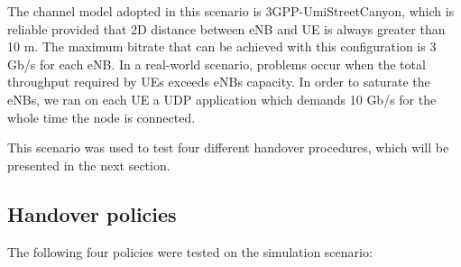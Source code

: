 \documentclass[conference,10pt]{IEEEtran}
\begin{document}
The channel model adopted in this scenario is 3GPP-UmiStreetCanyon, which is reliable provided that 2D distance between eNB and UE is always greater than 10 m. The maximum bitrate that can be achieved with this configuration is 3 Gb/s for each eNB. In a real-world scenario, problems occur when the total throughput required by UEs exceeds eNBs capacity. In order to saturate the eNBs, we ran on each UE a UDP application which demands 10 Gb/s for the whole time the node is connected.

This scenario was used to test four different handover procedures, which will be presented in the next section.



\noindent
\subsection{Handover policies}
The following four policies were tested on the simulation scenario:
\end{document}
